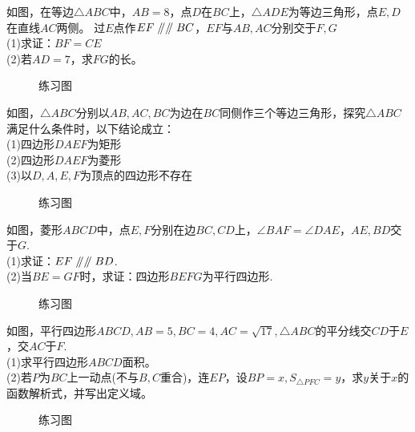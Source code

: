 \begin{problem}
如图，在等边$\triangle ABC$中，$AB=8$，点$D$在$BC$上，$\triangle ADE$为等边三角形，点$E,D$在直线$AC$两侧。
过$E$点作$EF\mathrel{/\mkern-5mu/}\mathrel{/\mkern-5mu/} BC$，$EF$与$AB,AC$分别交于$F,G$ \\
(1)求证：$BF=CE$ \\
(2)若$AD=7$，求$FG$的长。\\
\end{problem}
\begin{figure}[ht]
    \begin{minipage}[t]{0.48\textwidth}
        \centering
        \resizebox{4cm}{!}{}
        \caption{练习图}
    \end{minipage}
    \begin{minipage}[t]{0.48\textwidth}
        \centering
        \resizebox{4cm}{!}{}
        \caption{练习图}
    \end{minipage}
\end{figure}
\begin{problem}
如图，$\triangle ABC$分别以$AB,AC,BC$为边在$BC$同侧作三个等边三角形，探究$\triangle ABC$满足什么条件时，以下结论成立：\\
(1)四边形$DAEF$为矩形 \\
(2)四边形$DAEF$为菱形 \\
(3)以$D,A,E,F$为顶点的四边形不存在
\end{problem}
\begin{figure}[H]
    \centering
    \resizebox{4cm}{!}{}
    \caption{练习图}
\end{figure}
\begin{problem}
如图，菱形$ABCD$中，点$E,F$分别在边$BC,CD$上，$\angle BAF=\angle DAE$，$AE,BD$交于$G$. \\
(1)求证：$EF\mathrel{/\mkern-5mu/} \mathrel{/\mkern-5mu/} BD$. \\
(2)当$BE=GF$时，求证：四边形$BEFG$为平行四边形. \\
\end{problem}
\begin{figure}[H]
    \centering
    \resizebox{4cm}{!}{}
    \caption{练习图}
\end{figure}
\begin{problem}
如图，平行四边形$ABCD,AB=5,BC=4,AC=\sqrt{17},\triangle ABC$的平分线交$CD$于$E$，交$AC$于$F$. \\
(1)求平行四边形$ABCD$面积。\\
(2)若$P$为$BC$上一动点(不与$B,C$重合)，连$EP$，设$BP=x,S_{\triangle PFC}=y$，求$y$关于$x$的函数解析式，并写出定义域。\\
\end{problem}
\begin{figure}[H]
    \centering
    \resizebox{4cm}{!}{}
    \caption{练习图}
\end{figure}
\clearpage
